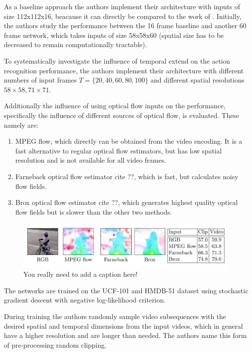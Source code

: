 As a baseline approach the authors implement their architecture with inputs of size 112x112x16, beacause it can directly be compared to the work of \cite{tran_learning_2015}.
Initially, the authors study the performance between the 16 frame baseline and another 60 frame network, which takes inputs of size 58x58x60 (spatial size has to be decreased to remain computationally tractable).

To systematically investigate the influence of temporal extend on the action recognition performance, the authors implement their architecture with different numbers of input frames $T = \{20, 40, 60, 80, 100\}$ and different spatial resolutions ${58 \times 58, 71 \times 71}$.

Additionally the influence of using optical flow inputs on the performance, specifically the influence of different sources of optical flow, is evaluated. These namely are:
\begin{enumerate}
    \item MPEG flow, which directly can be obtained from the video encoding. It is a fast alternative to regular optical flow estimators, but has low spatial resolution and is not available for all video frames.
    \item Farneback optical flow estimator cite ??, which is fast, but calculates noisy flow fields.
    \item Brox optical flow estimator cite ??, which generates highest quality optical flow fields but is slower than the other two methods.
\end{enumerate}

\begin{figure}[H]
    \centering
    \includegraphics[width=\textwidth]{img_deep/longterm_optflow}
    \caption{You really need to add a caption here!}
    \label{fig:longterm_optflow}
\end{figure}

The networks are trained on the UCF-101 and HMDB-51 dataset using stochastic gradient descent with negative log-likelihood criterion.

During training the authors randomly sample video subsequences with the desired spatial and temporal dimensions from the input videos, which in general have a higher resolution and are longer than needed. The authors name this form of pre-processing random clipping.

